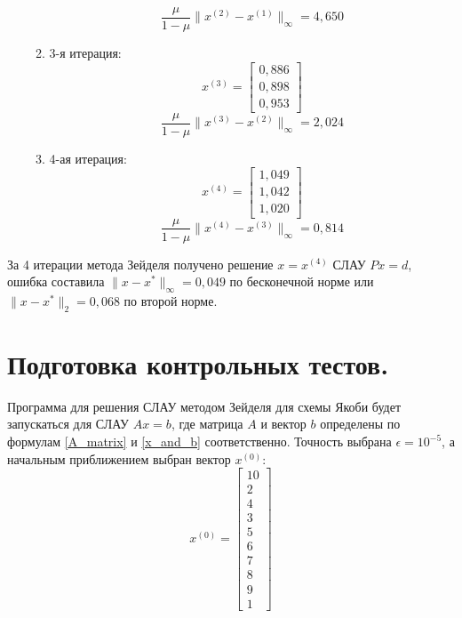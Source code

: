 \documentclass[a4paper, 12pt]{article}
\theoremstyle{definition}
\begin{document}
\begin{enumerate}
\begin{enumerate}
\begin{equation*}
			\end{equation*}
			\begin{equation*}
				\frac{\mu}{1-\mu}\|x^{(2)}-x^{(1)}\|_{\infty}=4,650
			\end{equation*}
			\item 3-я итерация:
			\begin{equation*}
				x^{(3)}=
				\begin{bmatrix}
					0,886 \\ 0,898 \\ 0,953
				\end{bmatrix}
			\end{equation*}
			\begin{equation*}
				\frac{\mu}{1-\mu}\|x^{(3)}-x^{(2)}\|_{\infty}=2,024
			\end{equation*}
			\item 4-ая итерация:
			\begin{equation*}
				x^{(4)}=
				\begin{bmatrix}
					1,049  \\ 1,042 \\  1,020
				\end{bmatrix}
			\end{equation*}
			\begin{equation*}
				\frac{\mu}{1-\mu}\|x^{(4)}-x^{(3)}\|_{\infty}=0,814
			\end{equation*}
		\end{enumerate}
	\end{enumerate}
	За 4 итерации метода Зейделя получено решение $x=x^{(4)}$ СЛАУ $Px=d$, ошибка составила $\|x-x^*\|_{\infty}=0,049$ по бесконечной норме или $\|x-x^*\|_{2}=0,068$ по второй норме.
	
	\section{Подготовка контрольных тестов.}
	
	Программа для решения СЛАУ методом Зейделя для схемы Якоби будет запускаться для СЛАУ $Ax=b$, где матрица $A$ и вектор $b$ определены по формулам \eqref{A_matrix} и \eqref{x_and_b} соответственно. Точность выбрана $\epsilon=10^{-5}$, а начальным приближением выбран вектор $x^{(0)}$:
	\begin{equation} \label{x0_vector}
		x^{(0)}=
		\begin{bmatrix}
			10\\ 2\\ 4\\ 3\\ 5\\ 6\\ 7\\ 8\\ 9\\ 1
		\end{bmatrix}
	\end{equation}
	
\end{document}
